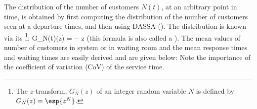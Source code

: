 The distribution of the number of customers $N(t)$, at an
arbitrary point in time, is obtained by first computing the
distribution of the number of customers seen at a departure
times, and then using DASSA (\cite[Section
5.6]{kleinrock-75-a}). The distribution is known via its
\footnote{The $z$-transform,
$G_N(z)$ of an integer random variable $N$
is defined by $G_N(z)=\esp{z^N}$.}:
 \be
 G_{N(t)}(z) = -\rho\rp {}- z \rp{}
 \ee
(this formula is also called a
).
The mean values of number of customers in system
or in waiting room and the mean response times
and waiting times are easily derived and are
given below:
 \be{}
 \label{eq-q-mg1}
 \ee
Note the importance of the coefficient of
variation (CoV) of the service time.
%
%

